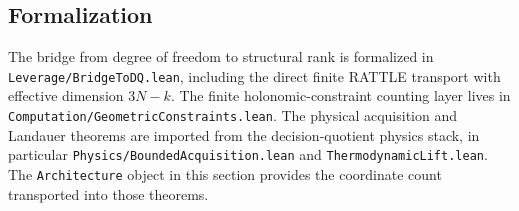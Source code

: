 \subsection{Formalization}

The bridge from degree of freedom to structural rank is formalized in \texttt{Leverage/BridgeToDQ.lean}, including the direct finite RATTLE transport with effective dimension $3N-k$. The finite holonomic-constraint counting layer lives in \texttt{Computation/GeometricConstraints.lean}. The physical acquisition and Landauer theorems are imported from the decision-quotient physics stack, in particular \texttt{Physics/BoundedAcquisition.lean} and \texttt{ThermodynamicLift.lean}. The \texttt{Architecture} object in this section provides the coordinate count transported into those theorems.
